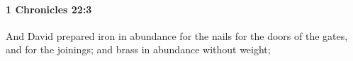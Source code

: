 
		\paragraph{1 Chronicles 22:3} %
			\label{1CHRONICLES-22-3}

			And David prepared iron in abundance for the nails for the doors of the gates, and for the joinings; and brass in abundance without weight;


